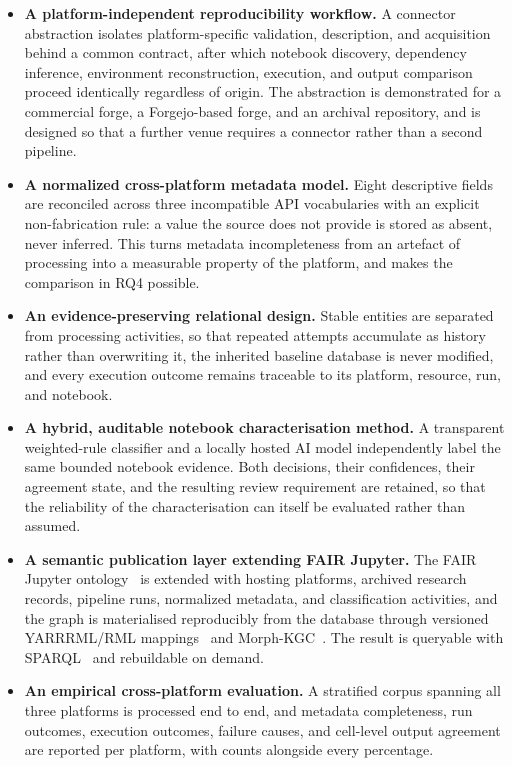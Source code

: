 \begin{itemize}[leftmargin=1.4em]
  \item \textbf{A platform-independent reproducibility workflow.} A connector abstraction isolates platform-specific validation, description, and acquisition behind a common contract, after which notebook discovery, dependency inference, environment reconstruction, execution, and output comparison proceed identically regardless of origin. The abstraction is demonstrated for a commercial forge, a Forgejo-based forge, and an archival repository, and is designed so that a further venue requires a connector rather than a second pipeline.
  \item \textbf{A normalized cross-platform metadata model.} Eight descriptive fields are reconciled across three incompatible API vocabularies with an explicit non-fabrication rule: a value the source does not provide is stored as absent, never inferred. This turns metadata incompleteness from an artefact of processing into a measurable property of the platform, and makes the comparison in RQ4 possible.
  \item \textbf{An evidence-preserving relational design.} Stable entities are separated from processing activities, so that repeated attempts accumulate as history rather than overwriting it, the inherited baseline database is never modified, and every execution outcome remains traceable to its platform, resource, run, and notebook.
  \item \textbf{A hybrid, auditable notebook characterisation method.} A transparent weighted-rule classifier and a locally hosted AI model independently label the same bounded notebook evidence. Both decisions, their confidences, their agreement state, and the resulting review requirement are retained, so that the reliability of the characterisation can itself be evaluated rather than assumed.
  \item \textbf{A semantic publication layer extending FAIR Jupyter.} The FAIR Jupyter ontology~\cite{samuel2024fairjupyter} is extended with hosting platforms, archived research records, pipeline runs, normalized metadata, and classification activities, and the graph is materialised reproducibly from the database through versioned YARRRML/RML mappings~\cite{heyvaert2018yarrrml,rmlspec} and Morph-KGC~\cite{arenas2024morph}. The result is queryable with SPARQL~\cite{sparql2013} and rebuildable on demand.
  \item \textbf{An empirical cross-platform evaluation.} A stratified corpus spanning all three platforms is processed end to end, and metadata completeness, run outcomes, execution outcomes, failure causes, and cell-level output agreement are reported per platform, with counts alongside every percentage.
\end{itemize}

